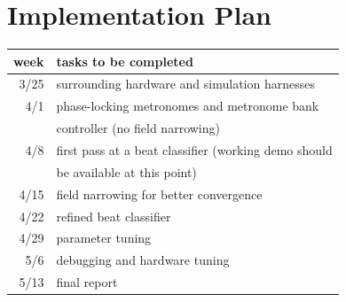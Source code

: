 \documentclass[letterpaper]{article}
\begin{document}
    
\section{Implementation Plan}
    
    \begin{table}[h!]
        \begin{center}
            \begin{tabular}{|rl|}
                \hline
                \textbf{week} & \textbf{tasks to be completed} \\
                \hline
                3/25 & surrounding hardware and simulation harnesses \\
                \hline
                4/1  & phase-locking metronomes and metronome bank \\
                     & controller (no field narrowing) \\
                \hline
                4/8  & first pass at a beat classifier (working demo should \\
                     & be available at this point) \\
                \hline
                4/15 & field narrowing for better convergence \\
                \hline
                4/22 & refined beat classifier \\
                \hline
                4/29 & parameter tuning \\
                \hline
                5/6  & debugging and hardware tuning \\
                \hline
                5/13  & final report \\
                \hline
            \end{tabular}
        \end{center}
        \label{tbl:sched}
    \end{table}
\end{document}
